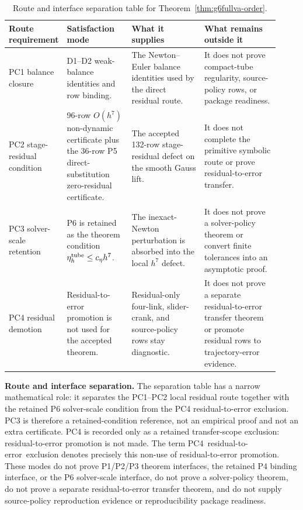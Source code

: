 \documentclass[preprint,12pt]{elsarticle}
\begin{document}
\begin{table}[htbp]
\centering
\caption{Route and interface separation table for
Theorem~\ref{thm:g6fullva-order}.}
\label{tab:pcp-close-requirement-separation-ledger}
\scriptsize
\setlength{\tabcolsep}{2pt}
\renewcommand{\arraystretch}{0.9}
\begin{tabular}{P{0.12\linewidth}P{0.24\linewidth}P{0.27\linewidth}P{0.29\linewidth}}
\toprule
Route requirement & Satisfaction mode & What it supplies & What remains outside it \\
\midrule
PC1 balance closure &
D1--D2 weak-balance identities and row binding. &
The Newton--Euler balance identities used by the direct residual route. &
It does not prove compact-tube regularity, source-policy rows, or package
readiness. \\
PC2 stage-residual condition &
96-row \(O(h^7)\) non-dynamic certificate plus the 36-row P5
direct-substitution zero-residual certificate. &
The accepted 132-row stage-residual defect on the smooth Gauss lift. &
It does not complete the primitive symbolic route or prove residual-to-error transfer. \\
PC3 solver-scale retention &
P6 is retained as the theorem condition
\(\eta_h^{\rm tube}\le c_\eta h^7\). &
The inexact-Newton perturbation is absorbed into the local \(h^7\) defect. &
It does not prove a solver-policy theorem or convert finite tolerances into
an asymptotic proof. \\
PC4 residual demotion &
Residual-to-error promotion is not used for the accepted theorem. &
Residual-only four-link, slider-crank, and source-policy rows stay diagnostic. &
It does not prove a separate residual-to-error transfer theorem or promote
residual rows to trajectory-error evidence. \\
\bottomrule
\end{tabular}
\end{table}

\noindent\textbf{Route and interface separation.}
The separation table has a narrow mathematical role: it separates the PC1--PC2
local residual route together with the retained P6 solver-scale condition from
the PC4 residual-to-error exclusion.  PC3 is therefore a retained-condition
reference, not an empirical proof and not an extra certificate.  PC4 is
recorded only as a retained transfer-scope exclusion: residual-to-error
promotion is not made.  The term \mbox{PC4 residual-to-error exclusion}
denotes precisely this non-use of residual-to-error promotion.  These modes do
not prove P1/P2/P3 theorem interfaces,
the retained P4 binding interface, or the P6 solver-scale interface, do not
prove a solver-policy theorem, do not prove a separate residual-to-error
transfer theorem, and do not supply source-policy reproduction evidence or
reproducibility package readiness.
\end{document}
